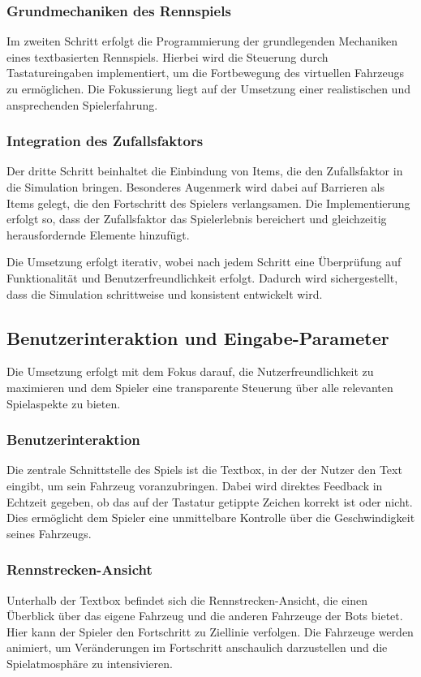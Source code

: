 \documentclass{article}
\begin{document}
\subsubsection{Grundmechaniken des Rennspiels}
Im zweiten Schritt erfolgt die Programmierung der grundlegenden Mechaniken eines textbasierten Rennspiels. Hierbei wird die Steuerung durch Tastatureingaben implementiert, um die Fortbewegung des virtuellen Fahrzeugs zu ermöglichen. Die Fokussierung liegt auf der Umsetzung einer realistischen und ansprechenden Spielerfahrung.

\subsubsection{Integration des Zufallsfaktors}
Der dritte Schritt beinhaltet die Einbindung von Items, die den Zufallsfaktor in die Simulation bringen. Besonderes Augenmerk wird dabei auf Barrieren als Items gelegt, die den Fortschritt des Spielers verlangsamen. Die Implementierung erfolgt so, dass der Zufallsfaktor das Spielerlebnis bereichert und gleichzeitig herausfordernde Elemente hinzufügt.

Die Umsetzung erfolgt iterativ, wobei nach jedem Schritt eine Überprüfung auf Funktionalität und Benutzerfreundlichkeit erfolgt. Dadurch wird sichergestellt, dass die Simulation schrittweise und konsistent entwickelt wird.

\subsection{Benutzerinteraktion und Eingabe-Parameter}
Die Umsetzung erfolgt mit dem Fokus darauf, die Nutzerfreundlichkeit zu maximieren und dem Spieler eine transparente Steuerung über alle relevanten Spielaspekte zu bieten.

\subsubsection{Benutzerinteraktion}
Die zentrale Schnittstelle des Spiels ist die Textbox, in der der Nutzer den Text eingibt, um sein Fahrzeug voranzubringen. Dabei wird direktes Feedback in Echtzeit gegeben, ob das auf der Tastatur getippte Zeichen korrekt ist oder nicht. Dies ermöglicht dem Spieler eine unmittelbare Kontrolle über die Geschwindigkeit seines Fahrzeugs.

\subsubsection{Rennstrecken-Ansicht}
Unterhalb der Textbox befindet sich die Rennstrecken-Ansicht, die einen Überblick über das eigene Fahrzeug und die anderen Fahrzeuge der Bots bietet. Hier kann der Spieler den Fortschritt zu Ziellinie verfolgen. Die Fahrzeuge werden animiert, um Veränderungen im Fortschritt anschaulich darzustellen und die Spielatmosphäre zu intensivieren.
\end{document}
